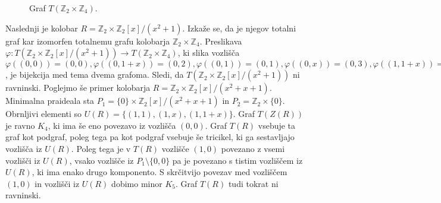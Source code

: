 \documentclass[a4paper, 12pt]{amsart}
\theoremstyle{definition} %
\theoremstyle{plain} %
\newcommand{\Z}{\mathbb Z}
\begin{document}
\begin{enumerate}
\begin{figure}[h!]
\centering

\caption{Graf $T(\Z_2\times \Z_4).$}
\label{T(Z2xZ4)}
\end{figure}

Naslednji je kolobar $R=\Z_2 \times \Z_2[x]/(x^2 + 1)$. Izkaže se, da je njegov totalni graf kar izomorfen totalnemu grafu kolobarja $\Z_2 \times \Z_4$. Preslikava $\varphi : T(\Z_2 \times \Z_2[x]/(x^2 + 1)) \rightarrow T(\Z_2 \times \Z_4)$, ki slika vozlišča $\varphi((0,0))=(0,0),\varphi((0,1+x))=(0,2),\varphi((0,1))=(0,1),\varphi((0,x))=(0,3),\varphi((1,1+x))=(1,2),\varphi((1,0))=(1,0),\varphi((1,x))=(1,3),\varphi((1,1))=(1,1)$, je bijekcija med tema dvema grafoma. Sledi, da $T(\Z_2 \times \Z_2[x]/(x^2 + 1))$ ni ravninski. Poglejmo še primer kolobarja $R=\Z_2 \times \Z_2[x]/(x^2 + x+1)$. Minimalna praideala sta $P_1 = \{0\} \times \Z_2[x]/(x^2 + x+1)$ in $P_2 = \Z_2 \times \{0\}$. Obrnljivi elementi so $U(R) = \{(1,1), (1,x),(1,1+x)\}$. Graf $T(Z(R))$ je ravno $K_4$, ki ima še eno povezavo iz vozlišča $(0,0)$. Graf $T(R)$ vsebuje ta graf kot podgraf, poleg tega pa kot podgraf vsebuje še tricikel, ki ga sestavljajo vozlišča iz $U(R)$. Poleg tega je v $T(R)$ vozlišče $(1,0)$ povezano z vsemi vozlišči iz $U(R)$, vsako vozlišče iz $P_1\setminus \{0,0\}$ pa je povezano  s tistim vozliščem iz $U(R)$, ki ima enako drugo komponento. S skrčitvijo povezav med vozliščem $(1,0)$ in vozlišči iz $U(R)$ dobimo minor $K_5$. Graf $T(R)$ tudi tokrat ni ravninski. 


\end{enumerate}
\end{document}
